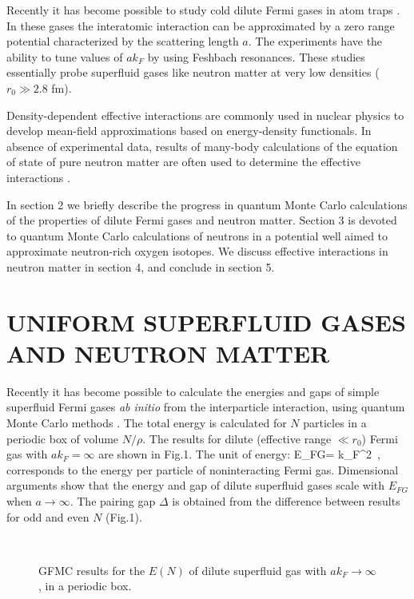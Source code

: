 Recently it has become possible to study cold dilute Fermi gases in atom traps 
\cite{atomt}.  In these gases the interatomic interaction can be approximated 
by a zero range potential characterized by the scattering length $a$. 
The experiments have the ability to tune values of $ak_F$ by using Feshbach 
resonances.  These studies essentially probe superfluid gases like neutron matter
at very low densities ($r_0 \gg 2.8$ fm). 

Density-dependent effective interactions are commonly used in nuclear physics 
to develop mean-field approximations based on energy-density functionals. 
In absence of experimental data, results of many-body calculations of the 
equation of state of pure neutron 
matter \cite{fp,wff} are often used to determine the effective interactions 
\cite{pr,sly4,faya}. 

In section 2 we briefly describe the progress in quantum Monte Carlo 
calculations of the properties of dilute Fermi gases and neutron matter. 
Section 3 is devoted to quantum Monte Carlo calculations of neutrons in a 
potential well aimed to approximate neutron-rich oxygen isotopes.  We 
discuss effective interactions in neutron matter in section 4, and 
conclude in section 5. 

\section{UNIFORM SUPERFLUID GASES AND NEUTRON MATTER}

Recently it has become possible to calculate the energies and gaps of simple 
superfluid Fermi gases {\em ab initio} from the interparticle interaction, 
using quantum Monte Carlo methods \cite{sfgprl}.  The total energy is 
calculated for $N$ particles in a periodic box of volume $N/\rho $.  The 
results for dilute (effective range $\ll r_0$) Fermi gas with $ak_F = \infty$ 
are shown in Fig.1.  The unit of energy:
\beq
E_{FG}=  k_F^2~,
\eeq
corresponds to the energy per particle of noninteracting Fermi gas.  Dimensional 
arguments show that the energy and gap of dilute superfluid gases scale with 
$E_{FG}$ when $a \rightarrow \infty$.  The pairing gap $\Delta$ is obtained from 
the difference between results for odd and even $N$ (Fig.1). 

\begin{figure}[t!]
\centerline
{\ }
\caption[fig]{ GFMC results for the $E(N)$ of dilute superfluid gas with 
$ak_F \rightarrow \infty$, in a periodic box.}
\label{fig:sfge}
\end{figure}

